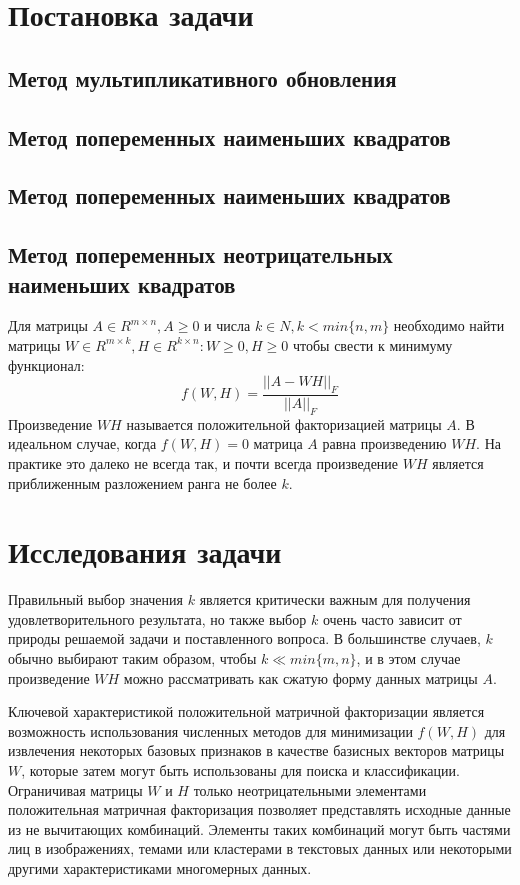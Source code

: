 
\newpage
\section{Постановка задачи}

\subsection{Метод мультипликативного обновления}
\subsection{Метод попеременных наименьших квадратов}
\subsection{Метод попеременных наименьших квадратов}
\subsection{Метод попеременных неотрицательных наименьших квадратов}


Для матрицы $A \in R^{m \times n}, A \geq 0$ и числа $k \in N, k < min\{n, m\}$ необходимо найти матрицы $W \in R^{m \times k}, H \in R^{k \times n} : W \geq 0, H \geq 0$ чтобы свести к минимуму функционал:
$$
f(W, H) = \dfrac{||A - WH||_F}{|| A ||_F}
$$
Произведение $WH$ называется положительной факторизацией матрицы $A$. В идеальном случае, когда $f(W,H) = 0$ матрица $A$ равна произведению $WH$. На практике это далеко не всегда так, и почти всегда произведение $WH$ является приближенным разложением ранга не более $k$.


\newpage


\section{Исследования задачи}

Правильный выбор значения $k$ является критически важным для получения удовлетворительного результата, но также выбор $k$ очень часто зависит от природы решаемой задачи и поставленного вопроса. В большинстве случаев, $k$ обычно выбирают таким образом, чтобы $k \ll min\{m, n\}$, и в этом случае произведение $WH$ можно рассматривать как сжатую форму данных матрицы $A$.

Ключевой характеристикой положительной матричной факторизации является возможность использования численных методов для минимизации $f(W,H)​$ для извлечения некоторых базовых признаков в качестве базисных векторов матрицы $W​$, которые затем могут быть использованы для поиска и классификации. Ограничивая матрицы $W​$ и $H​$ только неотрицательными элементами положительная матричная факторизация позволяет представлять исходные данные из не вычитающих комбинаций. Элементы таких комбинаций могут быть частями лиц в изображениях, темами или кластерами в текстовых данных или некоторыми другими характеристиками многомерных данных.

